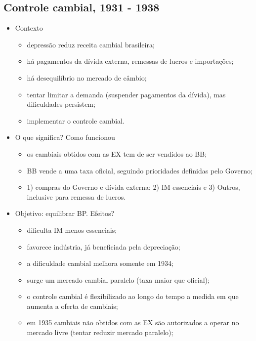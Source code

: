 \documentclass[a4paper,12pt]{article}[abntex2]
\begin{document}
\subsection{\textbf{Controle cambial, 1931 - 1938}}
\begin{itemize}
    \item Contexto
    \begin{itemize}
        \item depressão reduz receita cambial brasileira;
        \item há pagamentos da dívida externa, remessas de lucros e importações;
        \item há desequilíbrio no mercado de câmbio;
        \item tentar limitar a demanda (suspender pagamentos da dívida), mas dificuldades persistem;
        \item implementar o controle cambial.
    \end{itemize}
    \item  O que significa? Como funcionou
    \begin{itemize}
        \item os cambiais obtidos com as EX tem de ser vendidos ao BB;
        \item BB vende a uma taxa oficial, seguindo prioridades definidas pelo Governo;
        \item 1) compras do Governo e dívida externa;  2) IM essenciais e 3) Outros, inclusive para remessa de lucros.
    \end{itemize}
\end{itemize}
\begin{itemize}
    \item Objetivo: equilibrar BP. Efeitos?
    \begin{itemize}
        \item dificulta IM menos essenciais;
        \item favorece indústria, já beneficiada pela depreciação;
        \item a dificuldade cambial melhora somente em 1934;
        \item surge um mercado cambial paralelo (taxa maior que oficial);
        \item o controle cambial é flexibilizado ao longo do tempo a medida em que aumenta a oferta de cambiais;
        \item em 1935 cambiais não obtidos com as EX são autorizados a operar no mercado livre (tentar reduzir mercado paralelo);
    \end{itemize}
\end{itemize}
\end{document}
